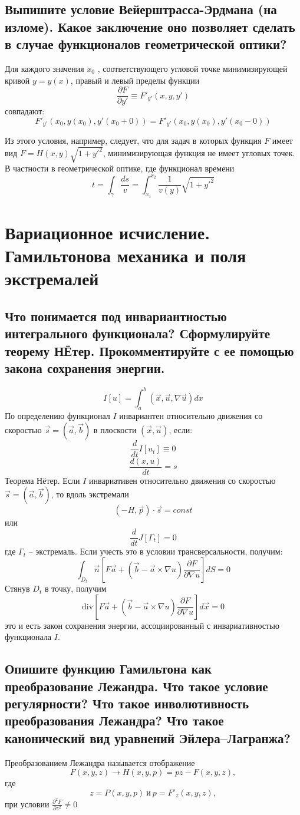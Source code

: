 \documentclass{article}
\begin{document}

\subsection{Выпишите условие Вейерштрасса-Эрдмана (на изломе). Какое заключение оно позволяет сделать в случае функционалов геометрической оптики?}
Для каждого значения $x_0$ , соответствующего угловой точке минимизирующей кривой $y = y(x)$, правый и левый пределы функции
\[\frac{\partial F}{\partial y'} \equiv F'_{y'}(x, y, y')\]
совпадают:
\[ F'_{y'}(x_0, y(x_0), y'(x_0+0))=F'_{y'}(x_0, y(x_0), y'(x_0-0)) \]

Из этого условия, например, следует, что для задач в которых функция $ F $ имеет вид $ F=H(x, y)\sqrt{1+y'^2}$, 
минимизирующая функция не имеет угловых точек. В частности в геометрической оптике, где функционал времени 
\[ t=\int_{\gamma} \frac{ds}{v} = \int_{x_1}^{x_2}  \frac{1}{v(y)}\sqrt{1+y'^2}\] 

\section{Вариационное исчисление. Гамильтонова механика и поля экстремалей}
\subsection{Что понимается под инвариантностью интегрального функционала? Сформулируйте теорему НЁтер. Прокомментируйте с ее помощью закона сохранения энергии.}
\[ I\left[u\right]=\int_{a}^{b}\left(\vec{x},\vec{u},\nabla \vec{u}\right)dx\]
По определению функционал $I$ инвариантен относительно движения со скоростью $\vec{s}=(\vec{a},\vec{b})$ в плоскости $(\vec{x},\vec{u})$, если:
\[\frac{d}{dt}I[u_t]\equiv0\]
\[\frac{d(x,u)}{dt}=s\]
Теорема Нётер. Если $I$ инвариативен относительно движения со скоростью $\vec s=(\vec a,\vec b)$, то вдоль экстремали 
\[(-H, \vec p)\cdot \vec s = const \]
или \[\frac{d}{dt}J[\Gamma_t]=0\]
где $\Gamma_t$ -- экстремаль. 
Если учесть это в условии трансверсальности, получим: 
\[\int_{D_t} \vec n \left[F\vec{a}+(\vec b-\vec{a}\times\nabla u)\frac{\partial F}{\partial\nabla u}\right]dS=0\]
Стянув $D_t$ в точку, получим
\[\text{div}\left[F\vec{a}+(\vec b-\vec{a}\times\nabla u)\frac{\partial F}{\partial\nabla u}\right]d\vec{x}=0\]
это и есть закон сохранения энергии, ассоциированный с инвариативностью функционала $I$.  
\subsection{Опишите функцию Гамильтона как преобразование Лежандра. Что такое условие регулярности? Что такое инволютивность преобразования Лежандра? Что такое канонический вид уравнений Эйлера--Лагранжа?}
Преобразованием Лежандра называется отображение 
\[ F(x,y,z) \rightarrow H(x, y, p) = pz-F(x,y,z), \]
где 
\[ z=P(x,y,p) \: \text{и} \: p=F'_z(x, y, z), \]
при условии $\frac{\partial^2 F}{\partial z^2} \neq 0$
\end{document}
